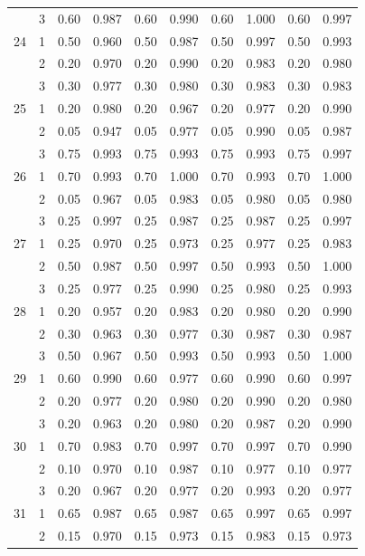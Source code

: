 \begin{longtable}{llcccccccc}
   & 3 & 0.60 & 0.987 & 0.60 & 0.990 & 0.60 & 1.000 & 0.60 & 0.997 \\ 
  24 & 1 & 0.50 & 0.960 & 0.50 & 0.987 & 0.50 & 0.997 & 0.50 & 0.993 \\ 
   & 2 & 0.20 & 0.970 & 0.20 & 0.990 & 0.20 & 0.983 & 0.20 & 0.980 \\ 
   & 3 & 0.30 & 0.977 & 0.30 & 0.980 & 0.30 & 0.983 & 0.30 & 0.983 \\ 
  25 & 1 & 0.20 & 0.980 & 0.20 & 0.967 & 0.20 & 0.977 & 0.20 & 0.990 \\ 
   & 2 & 0.05 & 0.947 & 0.05 & 0.977 & 0.05 & 0.990 & 0.05 & 0.987 \\ 
   & 3 & 0.75 & 0.993 & 0.75 & 0.993 & 0.75 & 0.993 & 0.75 & 0.997 \\ 
  26 & 1 & 0.70 & 0.993 & 0.70 & 1.000 & 0.70 & 0.993 & 0.70 & 1.000 \\ 
   & 2 & 0.05 & 0.967 & 0.05 & 0.983 & 0.05 & 0.980 & 0.05 & 0.980 \\ 
   & 3 & 0.25 & 0.997 & 0.25 & 0.987 & 0.25 & 0.987 & 0.25 & 0.997 \\ 
  27 & 1 & 0.25 & 0.970 & 0.25 & 0.973 & 0.25 & 0.977 & 0.25 & 0.983 \\ 
   & 2 & 0.50 & 0.987 & 0.50 & 0.997 & 0.50 & 0.993 & 0.50 & 1.000 \\ 
   & 3 & 0.25 & 0.977 & 0.25 & 0.990 & 0.25 & 0.980 & 0.25 & 0.993 \\ 
  28 & 1 & 0.20 & 0.957 & 0.20 & 0.983 & 0.20 & 0.980 & 0.20 & 0.990 \\ 
   & 2 & 0.30 & 0.963 & 0.30 & 0.977 & 0.30 & 0.987 & 0.30 & 0.987 \\ 
   & 3 & 0.50 & 0.967 & 0.50 & 0.993 & 0.50 & 0.993 & 0.50 & 1.000 \\ 
  29 & 1 & 0.60 & 0.990 & 0.60 & 0.977 & 0.60 & 0.990 & 0.60 & 0.997 \\ 
   & 2 & 0.20 & 0.977 & 0.20 & 0.980 & 0.20 & 0.990 & 0.20 & 0.980 \\ 
   & 3 & 0.20 & 0.963 & 0.20 & 0.980 & 0.20 & 0.987 & 0.20 & 0.990 \\ 
  30 & 1 & 0.70 & 0.983 & 0.70 & 0.997 & 0.70 & 0.997 & 0.70 & 0.990 \\ 
   & 2 & 0.10 & 0.970 & 0.10 & 0.987 & 0.10 & 0.977 & 0.10 & 0.977 \\ 
   & 3 & 0.20 & 0.967 & 0.20 & 0.977 & 0.20 & 0.993 & 0.20 & 0.977 \\ 
  31 & 1 & 0.65 & 0.987 & 0.65 & 0.987 & 0.65 & 0.997 & 0.65 & 0.997 \\ 
   & 2 & 0.15 & 0.970 & 0.15 & 0.973 & 0.15 & 0.983 & 0.15 & 0.973 \\ 

\end{longtable}
